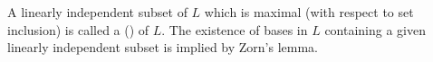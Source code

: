 A linearly independent subset of $L$ which is maximal (with respect to set inclusion) is called a  () of $L$. The existence of bases in $L$ containing a given linearly independent subset is implied by Zorn's lemma.
